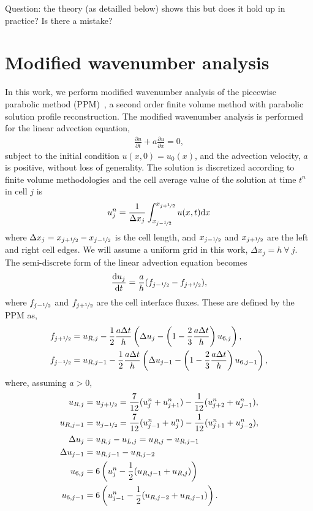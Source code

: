 \documentclass[review]{elsarticle}
\begin{document}
Question: the theory (as detailled below) shows this but does it hold up in practice? Is there a mistake?

\section{Modified wavenumber analysis}\label{sec:}

In this work, we perform modified wavenumber analysis of the piecewise
parabolic method (PPM)~\cite{Colella1984}, a second order finite
volume method with parabolic solution profile reconstruction. The
modified wavenumber analysis is performed for the linear advection
equation,
\begin{align}
  \label{eq:linear_advection}
  \frac{\partial u}{\partial t} + a \frac{\partial u}{\partial x} = 0,
\end{align}
subject to the initial condition $u(x,0) = u_0(x)$, and the advection
velocity, $a$ is positive, without loss of generality. The solution is
discretized according to finite volume methodologies and the cell
average value of the solution at time $t^n$ in cell $j$ is
\begin{align}
  \label{eq:fv}
  u^n_j = \frac{1}{\Delta x_j} \int_{x_{j-\nicefrac{1}{2}}}^{x_{j+\nicefrac{1}{2}}} u(x,t) \mathrm{d}x
\end{align}
where $\Delta x_j = x_{j+\nicefrac{1}{2}} - x_{j-\nicefrac{1}{2}}$ is
the cell length, and $x_{j-\nicefrac{1}{2}}$ and
$x_{j+\nicefrac{1}{2}}$ are the left and right cell edges. We will
assume a uniform grid in this work, $\Delta x_j = h~\forall~j$. The
semi-discrete form of the linear advection equation becomes
\begin{align}
  \label{eq:discrete_advection}
  \frac{\mathrm{d} u_j}{\mathrm{d} t} =  \frac{a}{h} (f_{j-\nicefrac{1}{2}} - f_{j+\nicefrac{1}{2}}),
\end{align}
where $f_{j-\nicefrac{1}{2}}$ and $f_{j+\nicefrac{1}{2}}$ are the cell
interface fluxes. These are defined by the PPM as,
\begin{align}
  \label{eq:fluxes}
  f_{j+\nicefrac{1}{2}} &= u_{R,j} - \frac{1}{2} \frac{a \Delta t}{h} \left( \Delta u_j - \left( 1-\frac{2}{3} \frac{a \Delta t}{h} \right) u_{6,j} \right),\\
  f_{j-\nicefrac{1}{2}} &= u_{R,j-1} - \frac{1}{2} \frac{a \Delta t}{h} \left( \Delta u_{j-1} - \left( 1-\frac{2}{3} \frac{a \Delta t}{h} \right) u_{6,j-1} \right),
\end{align}
where, assuming $a>0$,
\begin{align*}
  u_{R,j} &= u_{j+\nicefrac{1}{2}} = \frac{7}{12} (u_j^n + u_{j+1}^n) - \frac{1}{12} (u_{j+2}^n + u_{j-1}^n),\\
  u_{R,j-1} &= u_{j-\nicefrac{1}{2}} = \frac{7}{12} (u_{j-1}^n + u_{j}^n) - \frac{1}{12} (u_{j+1}^n + u_{j-2}^n),\\
  \Delta u_j &= u_{R,j} - u_{L,j} = u_{R,j} - u_{R,j-1}\\
  \Delta u_{j-1} &= u_{R,j-1} - u_{R,j-2}\\
  u_{6,j} &= 6 \left( u_j^n - \frac{1}{2} (u_{R,j-1} + u_{R,j}) \right)\\
  u_{6,j-1} &= 6 \left( u_{j-1}^n - \frac{1}{2} (u_{R,j-2} + u_{R,j-1}) \right).
\end{align*}
\end{document}
